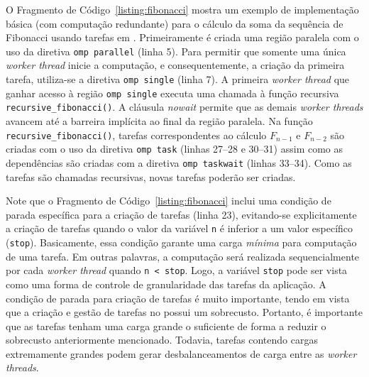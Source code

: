 \documentclass{SBCbookchapter}
\begin{document}
	O Fragmento de Código~\ref{listing:fibonacci} mostra um exemplo de
	implementação básica (com computação redundante) para o cálculo da soma da sequência de
	Fibonacci usando tarefas em \openmp. Primeiramente é criada uma
	região paralela com o uso da diretiva \texttt{omp parallel} (linha
	5). Para permitir que somente uma única \textit{worker thread}
	inicie a computação, e consequentemente, a criação da primeira
	tarefa, utiliza-se a diretiva \texttt{omp single} (linha 7). A
	primeira \textit{worker thread} que ganhar acesso à região
	\texttt{omp single} executa uma chamada à função recursiva
	\texttt{recursive\_fibonacci()}. A cláusula \textit{nowait} permite
	que as demais \textit{worker threads} avancem até a barreira
	implícita ao final da região paralela. Na função
	\texttt{recursive\_fibonacci()}, tarefas correspondentes ao cálculo
	$F_{n-1}$ e $F_{n-2}$ são criadas com o uso da diretiva \texttt{omp
	task} (linhas 27--28 e 30--31) assim como as dependências são
	criadas com a diretiva \texttt{omp taskwait} (linhas 33--34). Como as
	tarefas são chamadas recursivas, novas tarefas poderão
	ser criadas.
	
	Note que o Fragmento de Código~\ref{listing:fibonacci} inclui uma
	condição de parada específica para a criação de tarefas (linha 23),
	evitando-se explicitamente a criação de tarefas quando o valor da
	variável \texttt{n} é inferior a um valor específico
	(\texttt{stop}).  Basicamente, essa condição garante uma carga
	\textit{mínima} para computação de uma tarefa. Em outras palavras, a
	computação será realizada sequencialmente por cada \textit{worker
	thread} quando \texttt{n < stop}. Logo, a variável \texttt{stop}
	pode ser vista como uma forma de controle de granularidade das
	tarefas da aplicação.  A condição de parada para criação de tarefas
	é muito importante, tendo em vista que a criação e gestão de tarefas
	no \openmp possui um sobrecusto. Portanto, é importante
	que as tarefas tenham uma carga grande o suficiente de forma a
	reduzir o sobrecusto anteriormente mencionado. Todavia, tarefas
	contendo cargas extremamente grandes podem gerar desbalanceamentos
	de carga entre as \textit{worker threads}.
\end{document}
